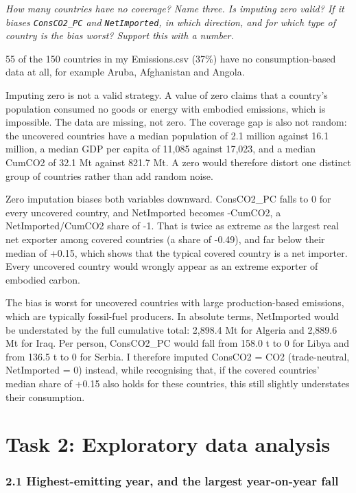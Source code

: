 \documentclass[
]{article}
\begin{document}
\emph{How many countries have no coverage? Name three. Is imputing zero
valid? If it biases \texttt{ConsCO2\_PC} and \texttt{NetImported}, in
which direction, and for which type of country is the bias worst?
Support this with a number.}

55 of the 150 countries in my Emissions.csv (37\%) have no
consumption-based data at all, for example Aruba, Afghanistan and
Angola.

Imputing zero is not a valid strategy. A value of zero claims that a
country's population consumed no goods or energy with embodied
emissions, which is impossible. The data are missing, not zero. The
coverage gap is also not random: the uncovered countries have a median
population of 2.1 million against 16.1 million, a median GDP per capita
of 11,085 against 17,023, and a median CumCO2 of 32.1 Mt against 821.7
Mt. A zero would therefore distort one distinct group of countries
rather than add random noise.

Zero imputation biases both variables downward. ConsCO2\_PC falls to 0
for every uncovered country, and NetImported becomes -CumCO2, a
NetImported/CumCO2 share of -1. That is twice as extreme as the largest
real net exporter among covered countries (a share of -0.49), and far
below their median of +0.15, which shows that the typical covered
country is a net importer. Every uncovered country would wrongly appear
as an extreme exporter of embodied carbon.

The bias is worst for uncovered countries with large production-based
emissions, which are typically fossil-fuel producers. In absolute terms,
NetImported would be understated by the full cumulative total: 2,898.4
Mt for Algeria and 2,889.6 Mt for Iraq. Per person, ConsCO2\_PC would
fall from 158.0 t to 0 for Libya and from 136.5 t to 0 for Serbia. I
therefore imputed ConsCO2 = CO2 (trade-neutral, NetImported = 0)
instead, while recognising that, if the covered countries' median share
of +0.15 also holds for these countries, this still slightly understates
their consumption.

\newpage

\section{Task 2: Exploratory data
analysis}\label{task-2-exploratory-data-analysis}

\subsubsection{2.1 Highest-emitting year, and the largest year-on-year
fall}\label{highest-emitting-year-and-the-largest-year-on-year-fall}
\end{document}
